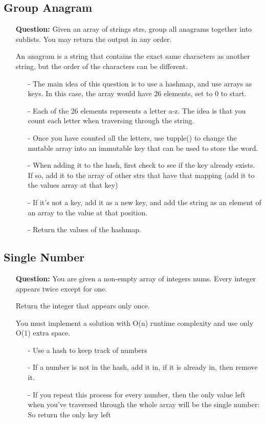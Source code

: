 \documentclass[12pt]{article}
\begin{document}
\subsection{Group Anagram}
\begin{enumerate}
  \item[] \textbf{Question:} Given an array of strings strs, group all anagrams together into sublists. You may return the output in any order.

An anagram is a string that contains the exact same characters as another string, but the order of the characters can be different.

    \begin{enumerate}
      \item[-] The main idea of this question is to use a hashmap, and use arrays as keys. In this case, the array would have 26 elements, set to 0 to start. 
      \item[-] Each of the 26 elements represents a letter a-z. The idea is that you count each letter when traversing through the string.  
      \item[-] Once you have counted all the letters, use tupple() to change the mutable array into an immutable key that can be used to store the word.
      \item[-] When adding it to the hash, first check to see if the key already exists. If so, add it to the array of other strs that have that mapping (add it to the values array at that key)
      \item[-] If it's not a key, add it as a new key, and add the string as an element of an array to the value at that position. 
      \item[-] Return the values of the hashmap. 
    \end{enumerate}
\end{enumerate}


\subsection{Single Number}
\begin{enumerate}
  \item[] \textbf{Question:} You are given a non-empty array of integers nums. Every integer appears twice except for one.

Return the integer that appears only once.

You must implement a solution with O(n) runtime complexity and use only  O(1) extra space. 


    \begin{enumerate}
      \item[-] Use a hash to keep track of numbers
      \item[-] If a number is not in the hash, add it in, if it is already in, then remove it.  
      \item[-] If you repeat this process for every number, then the only value left when you've traversed through the whole array will be the single number: So return the only key left
    \end{enumerate}
\end{enumerate}
\end{document}
